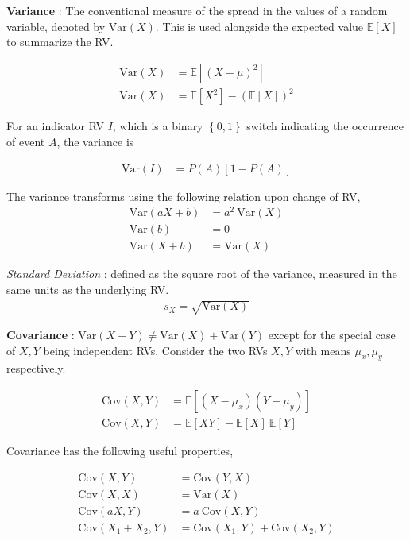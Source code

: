 \textbf{Variance} : The conventional measure of the spread in the values of a random variable, denoted by $ \mathrm{Var}(X) $. This is used alongside the expected value $ \mathbb{E}[X] $ to summarize the RV.

\begin{align}
	\mathrm{Var}(X) &= \mathbb{E}[(X - \mu)^2] \\
	\mathrm{Var}(X) &= \mathbb{E}[X^2] - (\mathbb{E}[X])^2
\end{align}

For an indicator RV $ I $, which is a binary $ \left\{0, 1\right\} $ switch indicating the occurrence of event $ A $, the variance is 

\begin{align}
	\mathrm{Var}(I) &= P(A) [1 - P(A)]
\end{align}

The variance transforms using the following relation upon change of RV, 
\begin{align}
	\mathrm{Var}(aX + b) &= a^2 \ \mathrm{Var}(X) \\
	\mathrm{Var}(b) &= 0 \\
	\mathrm{Var}(X + b) &= \mathrm{Var}(X)
\end{align}

\textit{Standard Deviation} : defined as the square root of the variance, measured in the same units as the underlying RV. 
\begin{align}
	s_X = \sqrt{\mathrm{Var}(X)}
\end{align}

\textbf{Covariance} : $ \mathrm{Var}(X + Y) \neq \mathrm{Var}(X) + \mathrm{Var}(Y) $ except for the special case of $ X, Y $ being independent RVs. Consider the two RVs $ X, Y $ with means $ \mu_x , \mu_y$ respectively.

\begin{align}
	\mathrm{Cov}(X, Y) &= \mathbb{E}[(X - \mu_x)(Y - \mu_y)] \\
	\mathrm{Cov}(X, Y) &= \mathbb{E}[XY] - \mathbb{E}[X] \ \mathbb{E}[Y]
\end{align}

Covariance has the following useful properties, 

\begin{align}
	\mathrm{Cov}(X, Y) &= \mathrm{Cov}(Y, X) \\
	\mathrm{Cov}(X, X) &= \mathrm{Var}(X) \\
	\mathrm{Cov}(aX, Y) &= a \ \mathrm{Cov}(X, Y) \\
	\mathrm{Cov}(X_1 + X_2, Y) &= \mathrm{Cov}(X_1, Y) + \mathrm{Cov}(X_2, Y)
\end{align}

